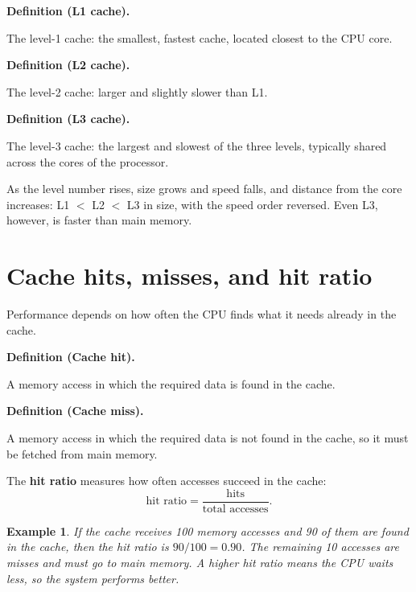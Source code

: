 \documentclass[11pt]{article}
\newtheorem{example}{Example}[section]
\newenvironment{definitionbox}[1]{%
  \par\noindent\textbf{Definition (#1).}\ \itshape
}{\par\vspace{0.3em}}
\begin{document}
\begin{definitionbox}{L1 cache}
The level-1 cache: the smallest, fastest cache, located closest to the CPU
core.
\end{definitionbox}

\begin{definitionbox}{L2 cache}
The level-2 cache: larger and slightly slower than L1.
\end{definitionbox}

\begin{definitionbox}{L3 cache}
The level-3 cache: the largest and slowest of the three levels, typically
shared across the cores of the processor.
\end{definitionbox}

As the level number rises, size grows and speed falls, and distance from the
core increases: L1 $<$ L2 $<$ L3 in size, with the speed order reversed.
Even L3, however, is faster than main memory.

\section{Cache hits, misses, and hit ratio}
Performance depends on how often the CPU finds what it needs already in the
cache.

\begin{definitionbox}{Cache hit}
A memory access in which the required data is found in the cache.
\end{definitionbox}

\begin{definitionbox}{Cache miss}
A memory access in which the required data is not found in the cache, so it
must be fetched from main memory.
\end{definitionbox}

The \textbf{hit ratio} measures how often accesses succeed in the cache:
\[
\text{hit ratio} = \frac{\text{hits}}{\text{total accesses}}.
\]

\begin{example}
If the cache receives 100 memory accesses and 90 of them are found in the
cache, then the hit ratio is $90/100 = 0.90$. The remaining 10 accesses are
misses and must go to main memory. A higher hit ratio means the CPU waits
less, so the system performs better.
\end{example}
\end{document}
